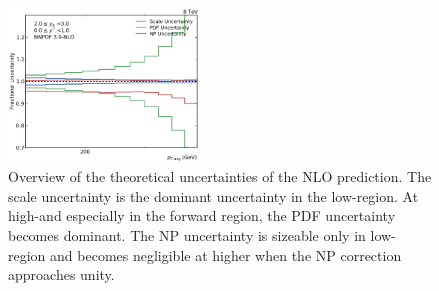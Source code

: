 \begin{figure}[htp]
    \includegraphics[width=0.45\textwidth]{figures/theory/theo_unc_yb2ys0.pdf}
    \caption{Overview of the theoretical uncertainties of the NLO prediction.
    The scale uncertainty is the dominant uncertainty in the low-\pt region. At
high-\pt and especially in the forward region, the PDF uncertainty becomes
dominant. The NP uncertainty is sizeable only in low-\pt region and becomes
negligible at higher \pt when the NP correction approaches unity.}
    \label{fig:theo_uncertainties}
\end{figure}
